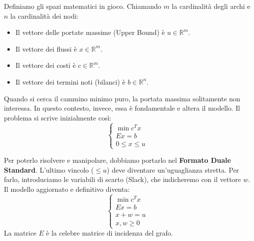 \documentclass[12pt, a4paper]{article}
\begin{document}
	Definiamo gli spazi matematici in gioco. Chiamando $m$ la cardinalità degli archi e $n$ la cardinalità dei nodi:
	\begin{itemize}[label=\textcolor{titlecolor}{\Large\textbullet}, itemsep=2pt, leftmargin=1.5cm]
		\item Il vettore delle portate massime (Upper Bound) è $u \in \mathbb{R}^m$.
		\item Il vettore dei flussi è $x \in \mathbb{R}^m$.
		\item Il vettore dei costi è $c \in \mathbb{R}^m$.
		\item Il vettore dei termini noti (bilanci) è $b \in \mathbb{R}^n$.
	\end{itemize}
	
	Quando si cerca il cammino minimo puro, la portata massima solitamente non interessa. In questo contesto, invece, essa è fondamentale e altera il modello. 
	Il problema si scrive inizialmente così:
	\[
	\begin{cases}
		\min c^T x \\
		Ex = b \\
		0 \le x \le u
	\end{cases}
	\]
	
	Per poterlo risolvere e manipolare, dobbiamo portarlo nel \textbf{Formato Duale Standard}. L'ultimo vincolo ($\le u$) deve diventare un'uguaglianza stretta. Per farlo, introduciamo le variabili di scarto (Slack), che indicheremo con il vettore $w$.
	Il modello aggiornato e definitivo diventa:
	\[
	\begin{cases}
		\min c^T x \\
		Ex = b \\
		x + w = u \\
		x, w \ge 0
	\end{cases}
	\]
	La matrice $E$ è la celebre matrice di incidenza del grafo.
	
\end{document}
